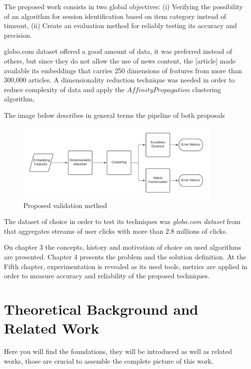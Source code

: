 \documentclass[ecp,tc,english]{iiufrgs}
\begin{document}
The proposed work consists in two global objectives: (i) Verifying the possibility of an algorithm for session identification based on item category instead of timeout, 
(ii) Create an evaluation method for reliably testing its accuracy and precision.

globo.com dataset offered a good amount of data, it was preferred instead of others, but since they do not allow the use of news content, the [article] made available its embeddings that carries 250 dimensions of features from more than 300,000 articles. A dimensionality reduction technique was needed in order to reduce complexity of data and apply the \(Affinity Propagation\) clustering algorithm,

The image below describes in general terms the pipeline of both proposals

\begin{figure}[!ht]
    \centering
    \includegraphics[width=0.9\textwidth]{images/experiment.png}
    \caption{Proposed validation method}
    \label{fig:method_architecture}
\end{figure}

The dataset of choice in order to test its techniques was  \textit{globo.com dataset} from \cite{deSouzaPereiraMoreira:2018:CDL:3240323.3240331} 
that aggregates streams of user clicks with more than 2.8 millions of clicks.

On chapter 3 the concepts, history and motivation of choice on used algorithms are presented. Chapter 4 presents the problem and the solution definition.
At the Fifth chapter, experimentation is revealed as its used tools, metrics are applied in order to measure accuracy and reliability of the proposed techniques.


\chapter{Theoretical Background and Related Work}
Here you will find the foundations, they will be introduced as well as related works, those are crucial to assemble the complete picture of this work.
\end{document}
